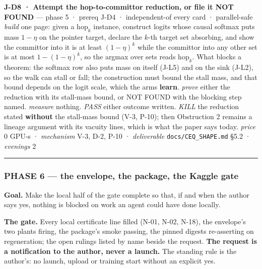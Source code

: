 \documentclass[11pt,a4paper]{article}
\theoremstyle{plain}
\theoremstyle{definition}
\theoremstyle{remark}
\begin{document}
\textbf{J-D8 · Attempt the hop-to-committor reduction, or file it NOT
FOUND} --- phase 5 · prereq J-D4 · independent-of every card ·
parallel-safe \emph{build} one page: given a \(\mathrm{hop}_k\)
instance, construct logits whose causal softmax puts mass \(1-\eta\) on
the pointer target, declare the \(k\)-th target set absorbing, and show
the committor into it is at least \((1-\eta)^k\) while the committor
into any other set is at most \(1-(1-\eta)^k\), so the argmax over sets
reads \(\mathrm{hop}_k\). What blocks a theorem: the softmax row also
puts mass on itself (J-L5) and on the sink (J-L2), so the walk can stall
or fall; the construction must bound the stall mass, and that bound
depends on the logit scale, which the arms \textbf{learn}. \emph{prove}
either the reduction with its stall-mass bound, or NOT FOUND with the
blocking step named. \emph{measure} nothing. \emph{PASS} either outcome
written. \emph{KILL} the reduction stated \textbf{without} the
stall-mass bound (V-3, P-10); then Obstruction 2 remains a lineage
argument with its vacuity lines, which is what the paper says today.
\emph{price} \(0\) GPU-s · \emph{mechanism} V-3, D-2, P-10 ·
\emph{deliverable} \texttt{docs/CEQ\_SHAPE.md} §5.2 · \emph{evenings} 2

\begin{center}\rule{0.5\linewidth}{0.5pt}\end{center}

\subsubsection{PHASE 6 --- the envelope, the package, the Kaggle
gate}\label{phase-6-the-envelope-the-package-the-kaggle-gate}

\textbf{Goal.} Make the local half of the gate complete so that, if and
when the author says yes, nothing is blocked on work an agent could have
done locally.

\textbf{The gate.} Every local certificate line filled (N-01, N-02,
N-18), the envelope's two plants firing, the package's smoke passing,
the pinned digests re-asserting on regeneration; the open rulings listed
by name beside the request. \textbf{The request is a notification to the
author, never a launch.} The standing rule is the author's: no launch,
upload or training start without an explicit yes.
\end{document}
